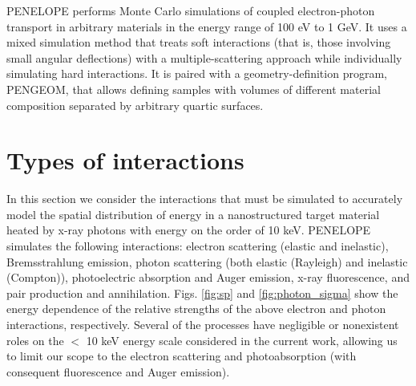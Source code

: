 \documentclass [11pt, proquest, article] {uwthesis}[2016/11/22]
\begin{document}
\label{Penelope} %




PENELOPE performs Monte Carlo simulations of coupled electron-photon transport in arbitrary materials in the energy range of 100 eV to 1 GeV. It uses a mixed simulation method that treats soft interactions (that is, those involving small angular deflections) with a multiple-scattering approach while individually simulating hard interactions. It is paired with a geometry-definition program, PENGEOM, that allows defining samples with volumes of different material composition separated by arbitrary quartic surfaces.

\section{Types of interactions}
In this section we consider the interactions that must be simulated to accurately model the spatial distribution of energy in a nanostructured target material heated by x-ray photons with energy on the order of 10 keV.
PENELOPE simulates the following interactions: electron scattering (elastic and inelastic), Bremsstrahlung emission, photon scattering (both elastic (Rayleigh) and inelastic (Compton)), photoelectric absorption and Auger emission, x-ray fluorescence, and pair production and annihilation. 
Figs. \ref{fig:sp} and \ref{fig:photon_sigma} show the energy dependence of the relative strengths of the above electron and photon interactions, respectively. 
Several of the processes have negligible or nonexistent roles on the $<$ 10 keV energy scale considered in the current work, allowing us to limit our scope to the electron scattering and photoabsorption (with consequent fluorescence and Auger emission).
\end{document}
